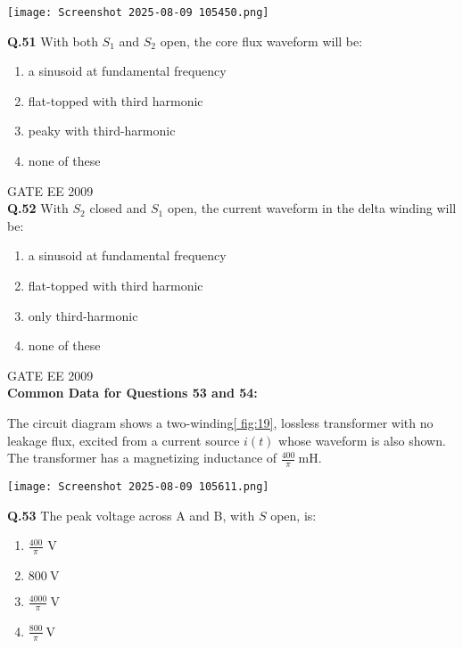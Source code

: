 \documentclass[12pt]{article}
\begin{document}
\begin{center}
\texttt{[image: Screenshot 2025-08-09 105450.png]}
\label{fig:18}
\end{center}

\textbf{Q.51} With both \(S_1\) and \(S_2\) open, the core flux waveform will be:

\begin{enumerate}
    
\item  a sinusoid at fundamental frequency 
\item  flat-topped with third harmonic 
\item  peaky with third-harmonic 
\item  none of these
\end{enumerate}


\vspace{0.5cm}
\hspace{10pt}
GATE EE 2009\\
\textbf{Q.52} With \(S_2\) closed and \(S_1\) open, the current waveform in the delta winding will be:

\begin{enumerate}
    

\item  a sinusoid at fundamental frequency 
\item  flat-topped with third harmonic 
\item  only third-harmonic 
\item none of these
\end{enumerate}

\vspace{1cm}
\hspace{10pt}
GATE EE 2009\\
\textbf{Common Data for Questions 53 and 54:}

The circuit diagram shows a two-winding\ref{

fig:19}, lossless transformer with no leakage flux, 
excited from a current source \(i(t)\) whose waveform is also shown.
The transformer has a magnetizing inductance of \(\frac{400}{\pi}\ \mathrm{mH}\).

\begin{center}
\texttt{[image: Screenshot 2025-08-09 105611.png]}
\label{fig:19}
\end{center}

\textbf{Q.53} The peak voltage across A and B, with \(S\) open, is:

\begin{enumerate}
 
\item \(\frac{400}{\pi} \text{ V}\) 
\item  \(800 \ \text{V}\) 
\item  \(\frac{4000}{\pi} \ \text{V}\) 
\item  \(\frac{800}{\pi} \ \text{V}\)
\end{enumerate}
\end{document}
